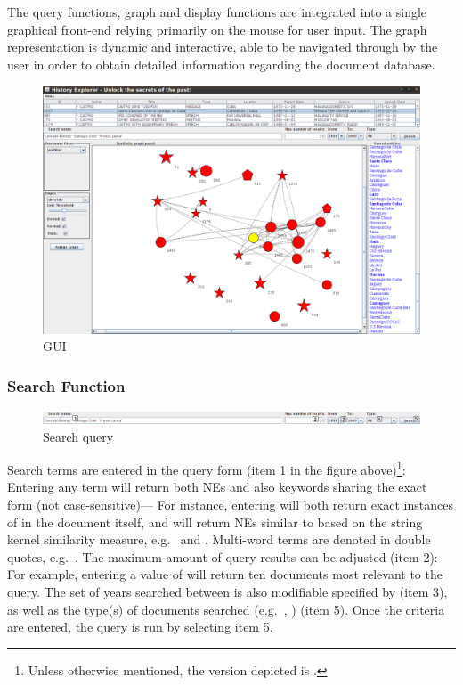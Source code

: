 The query functions, graph and display functions are integrated into a single graphical front-end relying primarily on the mouse for user input. The graph representation is dynamic and interactive, able to be navigated through by the user in order to obtain detailed information regarding the document database.

\begin{figure}[h]
\centering
\caption{GUI}
\includegraphics[width=160mm]{gui.png}
\end{figure}

\subsubsection{Search Function}
\begin{figure}[h]
\centering
\caption{Search query}
\includegraphics[width=160mm]{search.png}
\end{figure}

Search terms are entered in the query form (item 1 in the figure above)\footnote{Unless otherwise mentioned, the version depicted is .}: Entering any term will return both NEs and also keywords sharing the exact form (not case-sensitive)--- For instance, entering  will both return exact instances of  in the document itself, and will return NEs similar to  based on the string kernel similarity measure, e.g.\  and . Multi-word terms are denoted in double quotes, e.g.\ . The maximum amount of query results can be adjusted (item 2): For example, entering a value of  will return ten documents most relevant to the query. The set of years searched between is also modifiable specified by (item 3), as well as the type(s) of documents searched (e.g.\ , ) (item 5). Once the criteria are entered, the query is run by selecting item 5.

